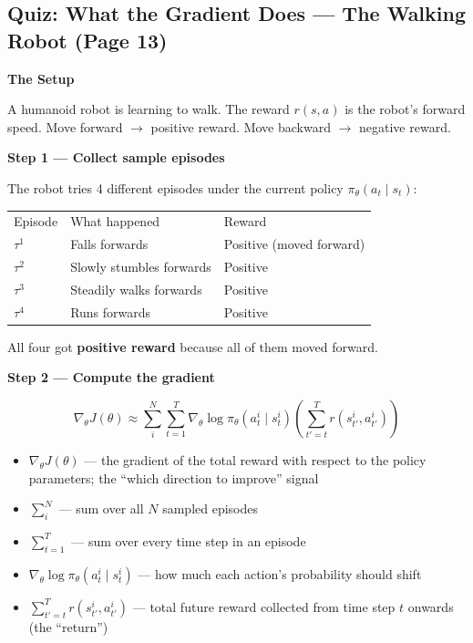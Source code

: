 \subsection{Quiz: What the Gradient Does --- The Walking Robot (Page 13)}

\textbf{The Setup}

A humanoid robot is learning to walk. The reward $r(s, a)$ is the robot's forward speed.
Move forward $\to$ positive reward. Move backward $\to$ negative reward.

\textbf{Step 1 --- Collect sample episodes}

The robot tries 4 different episodes under the current policy $\pi_\theta(a_t \mid s_t)$:

\begin{center}
\begin{tabular}{lll}
Episode & What happened & Reward \\[4pt]
$\tau^1$ & Falls forwards & Positive (moved forward) \\
$\tau^2$ & Slowly stumbles forwards & Positive \\
$\tau^3$ & Steadily walks forwards & Positive \\
$\tau^4$ & Runs forwards & Positive \\
\end{tabular}
\end{center}

All four got \textbf{positive reward} because all of them moved forward.

\textbf{Step 2 --- Compute the gradient}

\[
\nabla_\theta J(\theta)
\approx
\sum_i^N \sum_{t=1}^T
\nabla_\theta \log \pi_\theta(a_t^i \mid s_t^i)
\left( \sum_{t'=t}^{T} r(s_{t'}^i, a_{t'}^i) \right)
\]

\begin{itemize}
  \item $\nabla_\theta J(\theta)$ --- the gradient of the total reward with respect to the policy
    parameters; the ``which direction to improve'' signal
  \item $\sum_i^N$ --- sum over all $N$ sampled episodes
  \item $\sum_{t=1}^T$ --- sum over every time step in an episode
  \item $\nabla_\theta \log \pi_\theta(a_t^i \mid s_t^i)$ --- how much each action's probability
    should shift
  \item $\sum_{t'=t}^T r(s_{t'}^i, a_{t'}^i)$ --- total future reward collected from time step $t$
    onwards (the ``return'')
\end{itemize}

